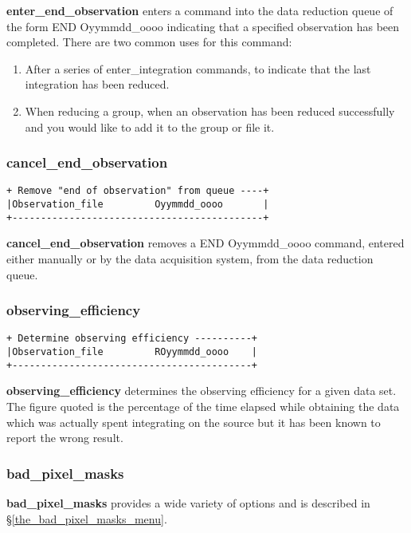 {{\bf enter\_end\_observation} enters a command into the data reduction 
queue of the form {\sf END Oyymmdd\_oooo} indicating that a specified 
observation has been completed. There are two common uses for this command:
\begin{enumerate}
\item After a series of {\sf enter\_integration} commands, to indicate 
that the last integration has been reduced.
\item When reducing a group, when an observation has been 
reduced successfully and you would like to add it to the group
or file it.
\end{enumerate}

\subsubsection{cancel\_end\_observation}
\label{cancel_end_observation}
\begin{verbatim}
+ Remove "end of observation" from queue ----+
|Observation_file         Oyymmdd_oooo       |
+--------------------------------------------+
\end{verbatim}

{\bf cancel\_end\_observation} removes a {\sf END Oyymmdd\_oooo} command,
entered either manually or by the data acquisition system, from the data 
reduction queue.

\subsubsection{observing\_efficiency}
\begin{verbatim}
+ Determine observing efficiency ----------+
|Observation_file         ROyymmdd_oooo    |
+------------------------------------------+
\end{verbatim}

{\bf observing\_efficiency} determines the observing efficiency for a 
given data set.
The figure quoted is the percentage of the time elapsed while obtaining
the data which was actually spent integrating on the source but it has been
known to report the wrong result.

\subsubsection{bad\_pixel\_masks}
\label{bpm}

{\bf bad\_pixel\_masks} provides a wide variety of options and is described 
in \S \ref{the_bad_pixel_masks_menu}.

}
